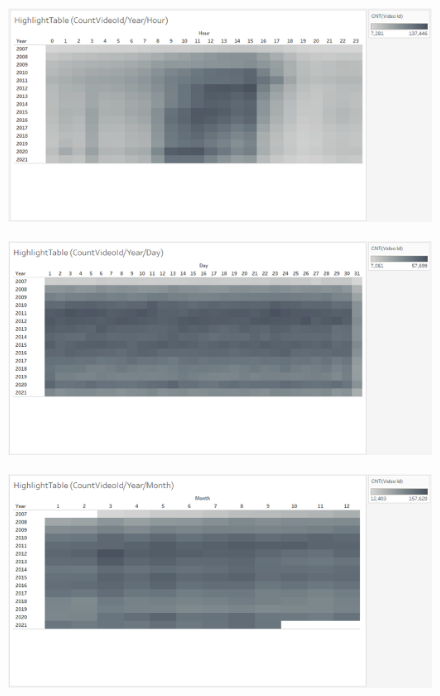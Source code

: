 \documentclass[submit,techrep,noauthor]{ipsj}
\begin{document}
\vspace{-1.0zh}
\begin{figure}[h]
  \begin{minipage}[b]{0.49\columnwidth}
    \centering
    \includegraphics[width=\columnwidth]{./eps/HighlightTable_CountVideoId_YearHour.eps}
    \label{fig:highlighttable_countvideoid_weekday_hour}
  \end{minipage}
  \begin{minipage}[b]{0.49\columnwidth}
    \centering
    \includegraphics[width=\columnwidth]{./eps/HighlightTable_CountVideoId_YearDay.eps}
    \label{fig:highlighttable_countvideoid_weekday_day}
  \end{minipage}
  \begin{minipage}[b]{0.49\columnwidth}
    \centering
    \hspace{-1.0zh}
    \includegraphics[width=\columnwidth]{./eps/HighlightTable_CountVideoId_YearMonth.eps}

\end{minipage}
\end{figure}
\end{document}
